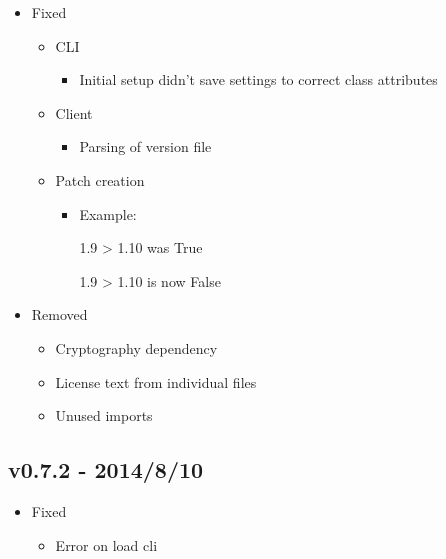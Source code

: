 \documentclass[letterpaper,10pt,english]{sphinxmanual}
\begin{document}
\begin{itemize}
\begin{itemize}
\begin{itemize}
\end{itemize}

\end{itemize}

\item {} 
Fixed
\begin{itemize}
\item {} 
CLI
\begin{itemize}
\item {} 
Initial setup didn't save settings
to correct class attributes

\end{itemize}

\item {} 
Client
\begin{itemize}
\item {} 
Parsing of version file

\end{itemize}

\item {} 
Patch creation
\begin{itemize}
\item {} 
Example:

1.9 \textgreater{} 1.10 was True

1.9 \textgreater{} 1.10 is now False

\end{itemize}

\end{itemize}

\item {} 
Removed
\begin{itemize}
\item {} 
Cryptography dependency

\item {} 
License text from individual files

\item {} 
Unused imports

\end{itemize}

\end{itemize}


\subsection{v0.7.2 - 2014/8/10}
\label{release_history:v0-7-2-2014-8-10}\begin{itemize}
\item {} 
Fixed
\begin{itemize}
\item {} 
Error on load cli

\end{itemize}

\end{itemize}
\end{document}
